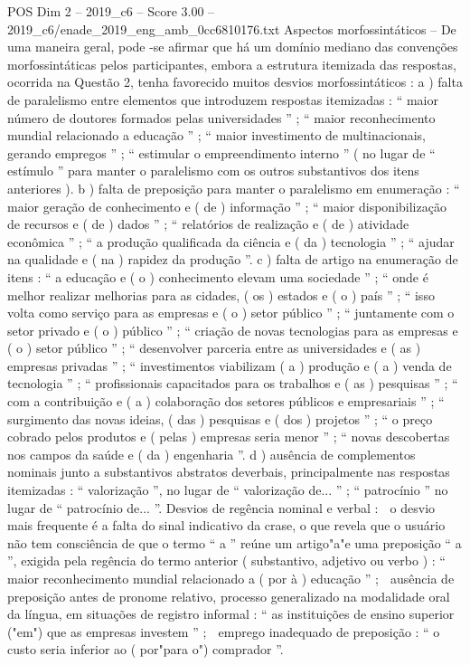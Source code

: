 \begin{textsample}{POS Dim 2 – 2019\_c6 – Score 3.00 – 2019\_c6/enade\_2019\_eng\_amb\_0cc6810176.txt}
Aspectos morfossintáticos – De uma maneira geral, pode -se afirmar que há um domínio mediano das convenções morfossintáticas pelos participantes, embora a estrutura itemizada das respostas, ocorrida na Questão 2, tenha favorecido muitos desvios morfossintáticos : a ) falta de paralelismo entre elementos que introduzem respostas itemizadas : “ maior número de doutores formados pelas universidades ” ; “ maior reconhecimento mundial relacionado a educação ” ; “ maior investimento de multinacionais, gerando empregos ” ; “ estimular o empreendimento interno ” ( no lugar de “ estímulo ” para manter o paralelismo com os outros substantivos dos itens anteriores ). b ) falta de preposição para manter o paralelismo em enumeração : “ maior geração de conhecimento e ( de ) informação ” ; “ maior disponibilização de recursos e ( de ) dados ” ; “ relatórios de realização e ( de ) atividade econômica ” ; “ a produção qualificada da ciência e ( da ) tecnologia ” ; “ ajudar na qualidade e ( na ) rapidez da produção ”. c ) falta de artigo na enumeração de itens : “ a educação e ( o ) conhecimento elevam uma sociedade ” ; “ onde é melhor realizar melhorias para as cidades, ( os ) estados e ( o ) país ” ; “ isso volta como serviço para as empresas e ( o ) setor público ” ; “ juntamente com o setor privado e ( o ) público ” ; “ criação de novas tecnologias para as empresas e ( o ) setor público ” ; “ desenvolver parceria entre as universidades e ( as ) empresas privadas ” ; “ investimentos viabilizam ( a ) produção e ( a ) venda de tecnologia ” ; “ profissionais capacitados para os trabalhos e ( as ) pesquisas ” ; “ com a contribuição e ( a ) colaboração dos setores públicos e empresariais ” ; “ surgimento das novas ideias, ( das ) pesquisas e ( dos ) projetos ” ; “ o preço cobrado pelos produtos e ( pelas ) empresas seria menor ” ; “ novas descobertas nos campos da saúde e ( da ) engenharia ”. d ) ausência de complementos nominais junto a substantivos abstratos deverbais, principalmente nas respostas itemizadas : “ valorização ”, no lugar de “ valorização de... ” ; “ patrocínio ” no lugar de “ patrocínio de... ”.
Desvios de regência nominal e verbal :  o desvio mais frequente é a falta do sinal indicativo da crase, o que revela que o usuário não tem consciência de que o termo “ a ” reúne um artigo"a"e uma preposição “ a ”, exigida pela regência do termo anterior ( substantivo, adjetivo ou verbo ) : “ maior reconhecimento mundial relacionado a ( por à ) educação ” ;  ausência de preposição antes de pronome relativo, processo generalizado na modalidade oral da língua, em situações de registro informal : “ as instituições de ensino superior ("em") que as empresas investem ” ;  emprego inadequado de preposição : “ o custo seria inferior ao ( por"para o") comprador ”.

\end{textsample}

